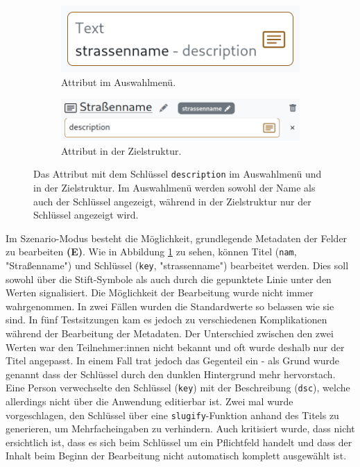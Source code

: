 \begin{figure}[!ht]
  \centering
  \begin{subfigure}{.35\textwidth}
    \includegraphics[width=\linewidth]{assets/attribute-source.png}
    \caption{Attribut im Auswahlmenü.}
  \end{subfigure}
  \hspace{.05\textwidth}
  \begin{subfigure}{.55\textwidth}
    \includegraphics[width=\linewidth]{assets/attribute-target.png}
    \caption{Attribut in der Zielstruktur.}
    \label{fig:attribute-target}
  \end{subfigure}
    \caption[Ein Attribut im Auswahlmenü und in der  Zielstruktur]{Das Attribut mit dem Schlüssel \texttt{description} im Auswahlmenü und in der  Zielstruktur. Im Auswahlmenü werden sowohl der Name als auch der Schlüssel angezeigt, während in der Zielstruktur nur der Schlüssel angezeigt wird.}
    \label{fig:attribute-source-target}
\end{figure}

Im Szenario-Modus besteht die Möglichkeit, grundlegende Metadaten der Felder zu bearbeiten \textbf{(E)}. Wie in Abbildung \ref{fig:attribute-target} zu sehen, können Titel (\texttt{nam}, "Straßenname") und Schlüssel (\texttt{key}, "strassenname") bearbeitet werden. Dies soll sowohl über die Stift-Symbole als auch durch die gepunktete Linie unter den Werten signalisiert. Die Möglichkeit der Bearbeitung wurde nicht immer wahrgenommen. In zwei Fällen wurden die Standardwerte so belassen wie sie sind. In fünf Testsitzungen kam es jedoch zu verschiedenen Komplikationen während der Bearbeitung der Metadaten. Der Unterschied zwischen den zwei Werten war den Teilnehmer:innen nicht bekannt und oft wurde deshalb nur der Titel angepasst. In einem Fall trat jedoch das Gegenteil ein - als Grund wurde genannt dass der Schlüssel durch den dunklen Hintergrund mehr hervorstach. Eine Person verwechselte den Schlüssel (\texttt{key}) mit der Beschreibung (\texttt{dsc}), welche allerdings nicht über die Anwendung editierbar ist. Zwei mal wurde vorgeschlagen, den Schlüssel über eine \texttt{slugify}-Funktion anhand des Titels zu generieren, um Mehrfacheingaben zu verhindern. Auch kritisiert wurde, dass nicht ersichtlich ist, dass es sich beim Schlüssel um ein Pflichtfeld handelt und dass der Inhalt beim Beginn der Bearbeitung nicht automatisch komplett ausgewählt ist.

